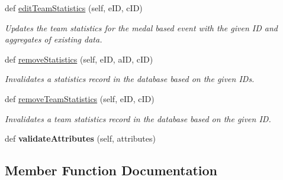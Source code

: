 \begin{DoxyCompactItemize}
def \hyperlink{classhandler_1_1medal__based__event_1_1_medal_based_event_handler_a91c4d3b7dbdc2f105536420c6d9d75d8}{edit\+Team\+Statistics} (self, e\+ID, c\+ID)
\begin{DoxyCompactList}\small\item\em Updates the team statistics for the medal based event with the given ID and aggregates of existing data. \end{DoxyCompactList}\item 
def \hyperlink{classhandler_1_1medal__based__event_1_1_medal_based_event_handler_a51117abdc0177b596a519761717625f5}{remove\+Statistics} (self, e\+ID, a\+ID, c\+ID)
\begin{DoxyCompactList}\small\item\em Invalidates a statistics record in the database based on the given I\+Ds. \end{DoxyCompactList}\item 
def \hyperlink{classhandler_1_1medal__based__event_1_1_medal_based_event_handler_ab8f6f7e19e058030b841467ea9df938a}{remove\+Team\+Statistics} (self, e\+ID, c\+ID)
\begin{DoxyCompactList}\small\item\em Invalidates a team statistics record in the database based on the given ID. \end{DoxyCompactList}\item 
\mbox{\label{classhandler_1_1medal__based__event_1_1_medal_based_event_handler_a2363b0df332c95dd09c18c6bd7ca71e0}} 
def {\bfseries validate\+Attributes} (self, attributes)
\end{DoxyCompactItemize}


\subsection{Member Function Documentation}
\mbox{\label{classhandler_1_1medal__based__event_1_1_medal_based_event_handler_a91c4d3b7dbdc2f105536420c6d9d75d8}} 
